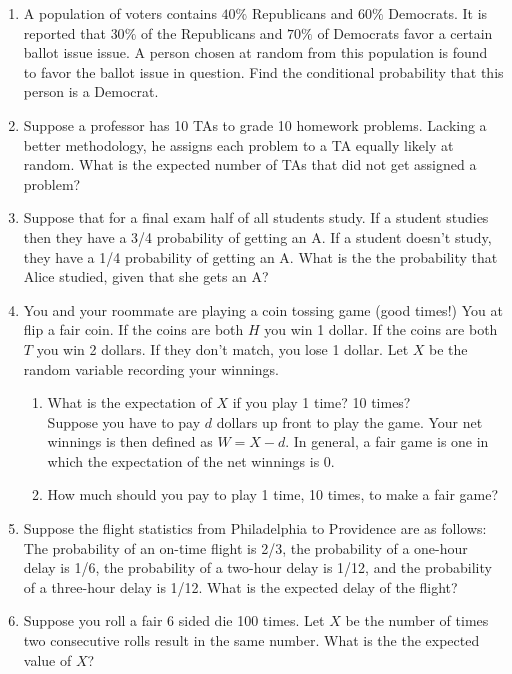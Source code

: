 \documentclass[12pt]{article}
\begin{document}
\begin{enumerate}
\item A population of voters contains $40\%$ Republicans and $60\%$ Democrats. It is reported that $30\%$ of the Republicans and $70\%$ of Democrats favor a certain ballot issue issue. A person chosen at random from this population is found to favor the ballot issue in question. Find the conditional probability that this person is a Democrat.

\item Suppose a professor has 10 TAs to grade 10 homework problems. Lacking a better methodology, he assigns each problem to a TA equally likely at random. What is the expected number of TAs that did not get assigned a problem?

\item Suppose that for a final exam half of all students study. If a student studies then they have a 3/4 probability of getting an A. If a student doesn’t study, they have a 1/4 probability of getting an A. What is the the probability that Alice studied, given that she gets an A?

\item You and your roommate are playing a coin tossing game (good times!) You at flip a fair coin. If the coins are both $H$ you win 1 dollar. If the coins are both $T$ you win 2 dollars. If they don't match, you lose 1 dollar. Let $X$ be the random variable recording your winnings.
\begin{enumerate}
\item What is the expectation of $X$ if you play 1 time? 10 times? \\

Suppose you have to pay $d$ dollars up front to play the game. Your net winnings is then defined as $W = X - d$. In general, a fair game is one in which the expectation of the net winnings is 0.
\item How much should you pay to play 1 time, 10 times, to make a fair game?
\end{enumerate}

\item Suppose the flight statistics from Philadelphia to Providence are as follows: The probability of an on-time flight is 2/3, the probability of a one-hour delay is 1/6, the probability of a two-hour delay is 1/12, and the probability of a three-hour delay is 1/12. What is the expected delay of the flight?

\item Suppose you roll a fair 6 sided die 100 times. Let $X$ be the number of times two consecutive rolls result in the same number. What is the the expected value of $X$?


\end{enumerate}
\end{document}
